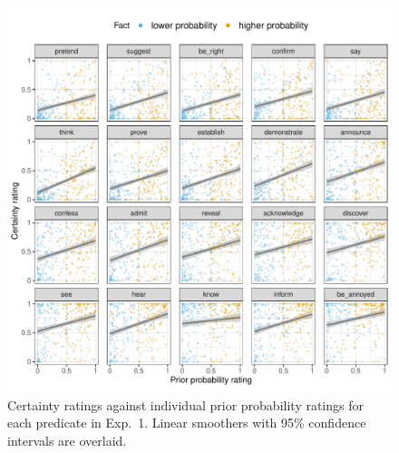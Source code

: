 \documentclass[11pt,fleqn]{article}
\newcommand{\6}{\mbox{$[\hspace*{-.6mm}[$}}
\newcommand{\9}{\mbox{$]\hspace*{-.6mm}]$}}
\begin{document}
\begin{figure}[h!]
\centering

\includegraphics[width=.7\paperwidth]{../../results/9-prior-projection/graphs/projection-by-prior}

\caption{Certainty ratings against individual prior probability ratings for each predicate in Exp.~1. Linear smoothers with 95\% confidence intervals are overlaid.}
\label{f-projection}
\end{figure}
\end{document}
